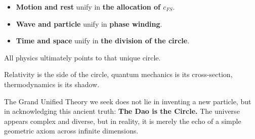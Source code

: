 \begin{itemize}
\item \textbf{Motion and rest} unify in \textbf{the allocation of $c_{FS}$}.

\item \textbf{Wave and particle} unify in \textbf{phase winding}.

\item \textbf{Time and space} unify in \textbf{the division of the circle}.
\end{itemize}

All physics ultimately points to that unique circle.

Relativity is the side of the circle, quantum mechanics is its cross-section, thermodynamics is its shadow.

The Grand Unified Theory we seek does not lie in inventing a new particle, but in acknowledging this ancient truth: \textbf{The Dao is the Circle.} The universe appears complex and diverse, but in reality, it is merely the echo of a simple geometric axiom across infinite dimensions.

